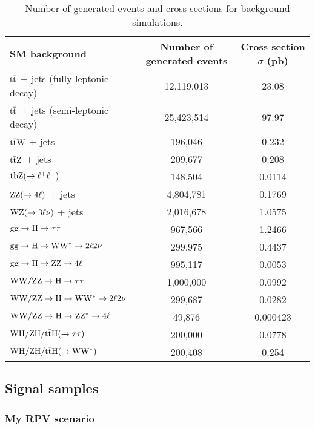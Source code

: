 \begin{table*}[!hbtp]
\centering
\caption{Number of generated events and cross sections for background simulations.}
\label{tab:TableMCInformation}
\begin{tabular}{l|c|c}
\hline \hline
SM background & Number of generated events &Cross section $\sigma$ (pb) \\
\hline
$\mathrm{t}\overline{\mathrm{t}}$ + jets (fully leptonic decay) & 12,119,013 & 23.08 \\ %
$\mathrm{t}\overline{\mathrm{t}}$ + jets (semi-leptonic decay) & 25,423,514 & 97.97 \\ %
$\mathrm{t}\overline{\mathrm{t}} \mathrm{W}$ + jets &196,046 & 0.232 \\ %
$\mathrm{t}\overline{\mathrm{t}} \mathrm{Z}$ + jets & 209,677 & 0.208 \\ %
$\mathrm{t} \mathrm{b} \mathrm{Z}(\to \ell^{+} \ell^{-})$ & 148,504 & 0.0114  \\ %
$\mathrm{Z} \mathrm{Z}(\to 4\ell)$ + jets & 4,804,781 & 0.1769 \\ %
$\mathrm{W} \mathrm{Z}(\to 3\ell \nu)$ + jets & 2,016,678 & 1.0575 \\ %
$\mathrm{g} \mathrm{g} \to \mathrm{H} \to \tau \tau$ & 967,566 & 1.2466 \\ %
$\mathrm{g} \mathrm{g} \to \mathrm{H} \to \mathrm{W} \mathrm{W}^{*} \to 2\ell 2\nu$ & 299,975 & 0.4437 \\ %
$\mathrm{g} \mathrm{g} \to \mathrm{H} \to \mathrm{Z} \mathrm{Z} \to 4\ell$ & 995,117 & 0.0053 \\ %
$\mathrm{W} \mathrm{W}/\mathrm{Z} \mathrm{Z} \to \mathrm{H} \to \tau \tau$ & 1,000,000 & 0.0992  \\ %
$\mathrm{W} \mathrm{W}/\mathrm{Z} \mathrm{Z} \to \mathrm{H} \to \mathrm{W} \mathrm{W}^{*} \to 2\ell 2\nu$ & 299,687 & 0.0282 \\ %
$\mathrm{W} \mathrm{W}/\mathrm{Z} \mathrm{Z} \to \mathrm{H} \to \mathrm{Z} \mathrm{Z}^{*} \to 4\ell$ & 49,876 & 0.000423 \\ %
$\mathrm{W} \mathrm{H}/\mathrm{Z} \mathrm{H}/\mathrm{t}\overline{\mathrm{t}} \mathrm{H}(\to \tau \tau)$ & 200,000 & 0.0778 \\ %
$\mathrm{W} \mathrm{H}/\mathrm{Z} \mathrm{H}/\mathrm{t}\overline{\mathrm{t}} \mathrm{H}(\to \mathrm{W} \mathrm{W}^{*})$ & 200,408 & 0.254 \\ %
\hline \hline
\end{tabular}
\end{table*}


\subsection{Signal samples}


\subsubsection*{My RPV scenario}
\label{sec:My RPV scenario}
